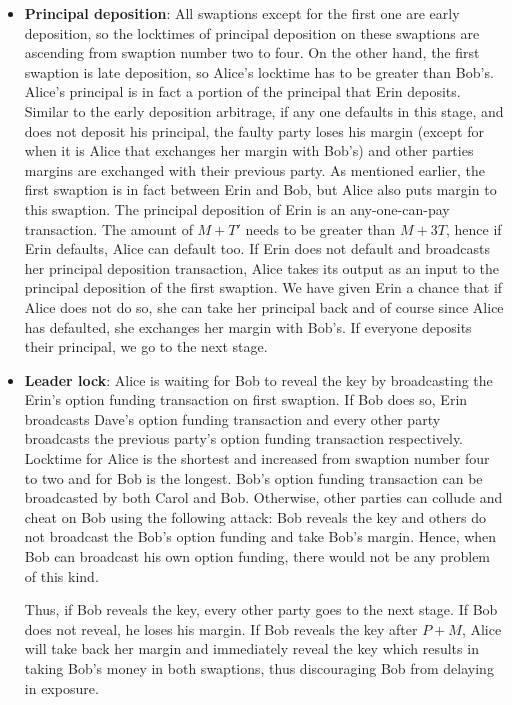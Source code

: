\begin{itemize}
    \item \textbf{Principal deposition}: All swaptions except for the first one are early deposition, so the locktimes of principal deposition on these swaptions are ascending from swaption number two to four. On the other hand, the first swaption is late deposition, so Alice's locktime has to be greater than Bob's. Alice's principal is in fact a portion of the principal that Erin deposits. Similar to the early deposition arbitrage, if any one defaults in this stage, and does not deposit his principal, the faulty party loses his margin (except for when it is Alice that exchanges her margin with Bob's) and other parties margins are exchanged with their previous party. As mentioned earlier, the first swaption is in fact between Erin and Bob, but Alice also puts margin to this swaption. The principal deposition of Erin is an any-one-can-pay transaction. The amount of $M+T'$ needs to be greater than $M+3T$, hence if Erin defaults, Alice can default too. If Erin does not default and broadcasts her principal deposition transaction, Alice takes its output as an input to the principal deposition of the first swaption. We have given Erin a chance that if Alice does not do so, she can take her principal back and of course since Alice has defaulted, she exchanges her margin with Bob's. If everyone deposits their principal, we go to the next stage.
    \item \textbf{Leader lock}: Alice is waiting for Bob to reveal the \keyone key by broadcasting the Erin's option funding transaction on first swaption. If Bob does so, Erin broadcasts Dave's option funding transaction and every other party broadcasts the previous party's option funding transaction respectively. Locktime for Alice is the shortest and increased from swaption number four to two and for Bob is the longest. Bob's option funding transaction can be broadcasted by both Carol and Bob. Otherwise, other parties can collude and cheat on Bob using the following attack: Bob reveals the \keyone key and others do not broadcast the Bob's option funding and take Bob's margin. Hence, when Bob can broadcast his own option funding, there would not be any problem of this kind. 
    
    Thus, if Bob reveals the key, every other party goes to the next stage. If Bob does not reveal, he loses his margin. If Bob reveals the \keyone key after $P + M$, Alice will take back her margin and immediately reveal the \Atwo key which results in taking Bob's money in both swaptions, thus discouraging Bob from delaying in exposure. 


\end{itemize}
